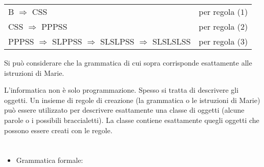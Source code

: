 {{\begin{adjustwidth}{1.5em}{0em}
\begin{tabular}{ @{} l l @{} }
  B \ensuremath{\Rightarrow} CSS & per regola ($1$) \\ 
  CSS \ensuremath{\Rightarrow} PPPSS & per regola ($2$) \\ 
  PPPSS \ensuremath{\Rightarrow} SLPPSS \ensuremath{\Rightarrow} SLSLPSS \ensuremath{\Rightarrow} SLSLSLSS & per regola ($3$)
\end{tabular}


\end{adjustwidth}

Si può considerare che la grammatica di cui sopra corrisponde esattamente alle istruzioni di Marie.

L’informatica non è solo programmazione. Spesso si tratta di descrivere gli oggetti. Un insieme di regole di creazione (la grammatica o le istruzioni di Marie) può essere utilizzato per descrivere esattamente una classe di oggetti (alcune parole o i possibili braccialetti). La classe contiene esattamente quegli oggetti che possono essere creati con le regole.



\section*{\BrochureWebsitesAndKeywords}
{\raggedright
\begin{itemize}
  \item Grammatica formale: \href{https://it.wikipedia.org/wiki/Grammatica_formale}{}
\end{itemize}


}

}{}

\def\AuthorCoolsaetK{} %
\def\AuthorJovanovM{} %
\def\AuthorStankovE{} %
\def\AuthorRossmanithP{} %
\def\AuthorGiangC{} %
\def\AuthorDatzkoS{} %
\def\AuthorFreiF{} %
\def\AuthorHromkovicJ{} %

\newpage}{}
